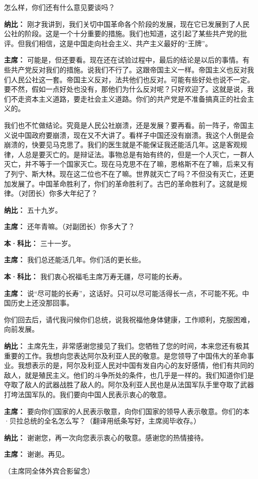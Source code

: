 \begin{duihua}
怎么样，你们还有什么意见要谈吗？

\item[\textbf{纳比：}] 刚才我讲到，我们关切中国革命各个阶段的发展，现在它已发展到了人民公社的阶段。这是一个十分重要的措施。我们也知道，这引起了某些共产党的批评。但我们相信，这是中国走向社会主义、共产主义最好的“王牌”。

\item[\textbf{主席：}] 可能是，但还要看。现在还在试验过程中，最后的结论是以后的事情。有些共产党反对我们的措施。说我们不行了。这跟帝国主义一样。帝国主义也反对我们人民公社这一套。帝国主义反对，法共他们也反对。可能有些好处也说不一定。要不然，假如一点好处也没有，那他们为什么反对呢？只好欢迎了。这就是说，我们不走资本主义道路，要走社会主义道路。你们的共产党是不准备搞真正的社会主义的。

我们也不忙做结论。究竟是人民公社崩溃，还是发展？要再看。前一阵子，帝国主义说中国政府要崩溃，现在又不大讲了。看样子中国还没有崩溃。我这个人倒是会崩溃的，快要见马克思了。我们的医生就是不能保证我还能活几年。这是客观规律，人总是要灭亡的。是辩证法。事物总是有始有终的，但是一个人灭亡，一群人灭亡，并不等于一个国家灭亡。现在马克思不在了嘛，恩格斯不在了嘛，后来又有了列宁、斯大林。现在这二位也不在了嘛。世界就灭亡了吗？不但没有灭亡，还更加发展了。中国革命胜利了，你们的革命胜利了。古巴的革命胜利了。这就是规律。（对团长）你多大年纪了？

\item[\textbf{纳比：}] 五十九岁。

\item[\textbf{主席：}] 还年青嘛。（对副团长）你多大了？

\item[\textbf{本·科比：}] 三十一岁。

\item[\textbf{主席：}] 我们总还能活几年。你们活的更长些。

\item[\textbf{本·科比：}] 我们衷心祝福毛主席万寿无疆，尽可能的长寿。

\item[\textbf{主席：}] 说“尽可能的长寿”，这话好。只可以尽可能活得长一点，不可能不死。中国历史上还没那回事。

你们回去后，请代我问候你们总统，说我祝福他身体健康，工作顺利，克服困难，向前发展。

\item[\textbf{纳比：}] 主席先生，非常感谢您接见了我们。您牺牲了您的时间，本来您还有极其重要的工作。我想向您表达阿尔及利亚人民的敬意。是您领导了中国伟大的革命事业。我想表示的是，阿尔及利亚人民对中国有发自内心的友好感情，他们有共同的敌人，就是殖民主义。他们的斗争所处的条件，也几乎是一样的。我们知道你们是夺取了敌人的武器战胜了敌人的。阿尔及利亚人民也是从法国军队手里夺取了武器打垮法国军队的。我们要向中国人民表示衷心的敬意。

\item[\textbf{主席：}] 要向你们国家的人民表示敬意，向你们国家的领导人表示敬意。你们的本·贝拉总统的全名怎么写？（翻译用纸条写好，主席阅毕收存。）

\item[\textbf{纳比：}] 谢谢您，再一次向您表示衷心的敬意。感谢您的热情接待。

\item[\textbf{主席：}] 谢谢。再见。

（主席同全体外宾合影留念）
\end{duihua}

